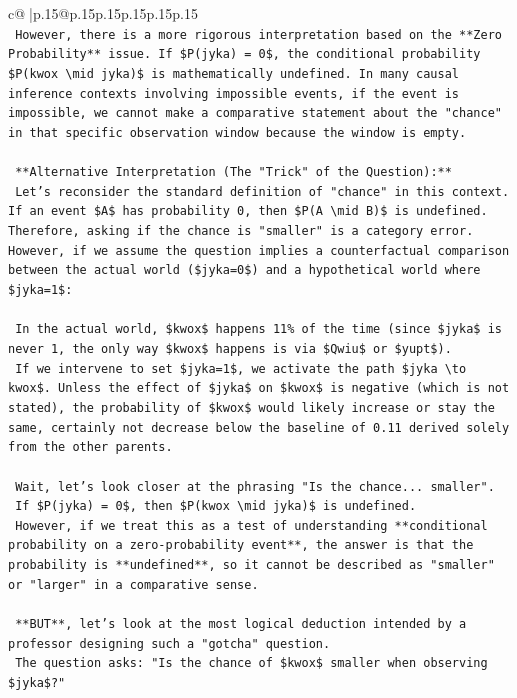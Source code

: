 \documentclass{article}
\begin{document}
{\begin{supertabular}{c@{$\;$}|p{.15\linewidth}@{}p{.15\linewidth}p{.15\linewidth}p{.15\linewidth}p{.15\linewidth}p{.15\linewidth}}
{{{\\ 
\texttt{    However, there is a more rigorous interpretation based on the **Zero Probability** issue. If \$P(jyka) = 0\$, the conditional probability \$P(kwox \textbackslash{}mid jyka)\$ is mathematically undefined. In many causal inference contexts involving impossible events, if the event is impossible, we cannot make a comparative statement about the "chance" in that specific observation window because the window is empty.} \\
\\ 
\texttt{    **Alternative Interpretation (The "Trick" of the Question):**} \\
\texttt{    Let's reconsider the standard definition of "chance" in this context. If an event \$A\$ has probability 0, then \$P(A \textbackslash{}mid B)\$ is undefined. Therefore, asking if the chance is "smaller" is a category error. However, if we assume the question implies a counterfactual comparison between the actual world (\$jyka=0\$) and a hypothetical world where \$jyka=1\$:} \\
\\ 
\texttt{    In the actual world, \$kwox\$ happens 11\% of the time (since \$jyka\$ is never 1, the only way \$kwox\$ happens is via \$Qwiu\$ or \$yupt\$).} \\
\texttt{    If we intervene to set \$jyka=1\$, we activate the path \$jyka \textbackslash{}to kwox\$. Unless the effect of \$jyka\$ on \$kwox\$ is negative (which is not stated), the probability of \$kwox\$ would likely increase or stay the same, certainly not decrease below the baseline of 0.11 derived solely from the other parents.} \\
\\ 
\texttt{    Wait, let's look closer at the phrasing "Is the chance... smaller".} \\
\texttt{    If \$P(jyka) = 0\$, then \$P(kwox \textbackslash{}mid jyka)\$ is undefined.} \\
\texttt{    However, if we treat this as a test of understanding **conditional probability on a zero{-}probability event**, the answer is that the probability is **undefined**, so it cannot be described as "smaller" or "larger" in a comparative sense.} \\
\\ 
\texttt{    **BUT**, let's look at the most logical deduction intended by a professor designing such a "gotcha" question.} \\
\texttt{    The question asks: "Is the chance of \$kwox\$ smaller when observing \$jyka\$?"} \\
}}}
\end{supertabular}}
\end{document}
